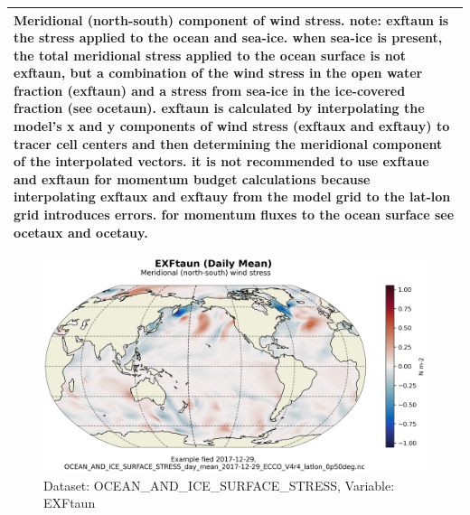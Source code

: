 \begin{longtable}{|m{}|m{}|m{}|m{}|}
\multicolumn{4}{|p{1\textwidth}|}{Meridional (north-south) component of wind stress. note: exftaun is the stress applied to the ocean and sea-ice. when sea-ice is present, the total meridional stress applied to the ocean surface is not exftaun, but a combination of the wind stress in the open water fraction (exftaun) and a stress from sea-ice in the ice-covered fraction (see ocetaun).  exftaun is calculated by interpolating the model's x and y components of wind stress (exftaux and exftauy) to tracer cell centers and then determining the meridional component of the interpolated vectors. it is not recommended to use exftaue and exftaun for momentum budget calculations because interpolating exftaux and exftauy from the model grid to the lat-lon grid introduces errors. for momentum fluxes to the ocean surface see ocetaux and ocetauy.} \\ \hline
\end{longtable}

\begin{figure}[H]
\centering
\includegraphics[scale=0.55]{../images/plots/latlon_plots/Ocean_and_Sea-Ice_Surface_Stress/EXFtaun.png}
\caption{Dataset: OCEAN\_AND\_ICE\_SURFACE\_STRESS, Variable: EXFtaun}
\label{tab:table-OCEAN_AND_ICE_SURFACE_STRESS_EXFtaun-Plot}
\end{figure}
\pagebreak
